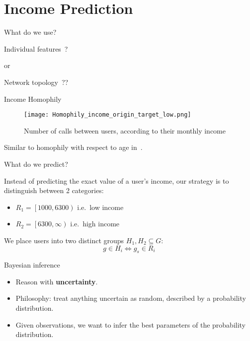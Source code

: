 \documentclass[usenames,dvipsnames]{beamer}
\newcommand{\closeopen}[2]{\left[ #1, #2 \right)}
\begin{document}
\section{Income Prediction}

\begin{frame}{What do we use?}

\centering

\begin{LARGE}
Individual features~?

\bigskip

or

\bigskip
\medskip

Network topology~??
\end{LARGE}
\end{frame}


\begin{frame}{Income Homophily}

\begin{figure}[h]
\begin{center}
\texttt{[image: Homophily\_income\_origin\_target\_low.png]}
\caption{Number of calls between users, according to their monthly income}
\label{homophily_heatmap}
\end{center}
\end{figure}
{\small Similar to homophily with respect to age in~\cite{brea2014}.
}
\end{frame}

\begin{frame}{What do we predict?}

Instead of predicting the exact value of a user's income, our strategy is to distinguish between 2 categories:
\begin{itemize}
\item $R_1 = \closeopen{1000}{6300}$ i.e.\ low income
\item $R_2 = \closeopen{6300}{\infty}$ i.e.\ high income
\end{itemize} 

\bigskip

We place users into two distinct groups $ H_1, H_2 \subseteq G$:
\[
	g \in H_i \iff g_s \in R_i
\]

\end{frame}


\begin{frame}{Bayesian inference}

\begin{itemize}
\item Reason with \textbf{uncertainty}.
\bigskip
\item Philosophy: treat anything uncertain as random, described by a probability distribution.
\bigskip
\item Given observations, we want to infer the best parameters of the probability distribution.

\end{itemize}
\end{frame}
\end{document}

